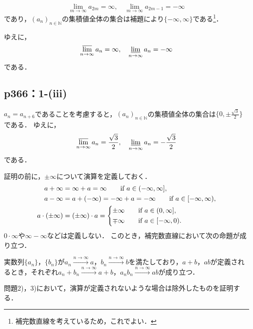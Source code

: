 \documentclass[a4paper,10pt,fleqn]{ltjsarticle}
\begin{document}
    \begin{tleftbar}
        \[
            \lim_{m \to \infty} a_{2m} = \infty , \quad \lim_{m \to \infty} a_{2m-1} = -\infty
        \]
        であり，$(a_n)_{n \in \mathbb{N}}$の集積値全体の集合は補題により$\{ -\infty , \infty \}$である\footnote{補完数直線を考えているため，これでよい．}．

        ゆえに，
        \[
            \varlimsup_{n \to \infty} a_n = \infty , \quad \varliminf_{n \to \infty} a_n =-\infty
        \]
        である．
    \end{tleftbar}

    \subsection*{p366：1-(iii)}

    \begin{tleftbar}
        $ a_{n} = a_{n+6}$であることを考慮すると，$(a_n)_{n \in \mathbb{N}}$の集積値全体の集合は$\{ 0 , \pm \frac{\sqrt{3}}{2} \}$である．
        ゆえに，
        \[
            \varlimsup_{n \to \infty} a_n = \frac{\sqrt{3}}{2} , \quad \varliminf_{n \to \infty} a_n =-\frac{\sqrt{3}}{2}
        \]
        である．
    \end{tleftbar}

    \newpage


    証明の前に，$\pm \infty$について演算を定義しておく．
    \begin{align*}
        a + \infty           & = \infty + a = \infty \qquad \text{if $a \in (-\infty,\infty]$},                   \\
        a - \infty           & = a + (-\infty) = -\infty + a = -\infty \qquad \text{if $a \in [-\infty,\infty)$}, \\
        a \cdot (\pm \infty) & = (\pm \infty) \cdot a =
        \begin{cases*}
            \pm \infty \quad & if $a \in (0,\infty]$,  \\
            \mp \infty \quad & if $a \in [-\infty,0)$.
        \end{cases*}
    \end{align*}
$0 \cdot \infty$や$\infty - \infty$などは定義しない．
このとき，補完数直線において次の命題が成り立つ．
\begin{lemm*}
    実数列$\{a_n\}$，$\{b_n\}$が$a_n \xrightarrow{n \to \infty} a$，$b_n \xrightarrow{n \to \infty} b$を満たしており，$a+b$，$ab$が定義されるとき，それぞれ$a_n + b_n \xrightarrow{n \to \infty} a+b$，$a_n b_n \xrightarrow{n \to \infty} ab$が成り立つ．
\end{lemm*}
問題2)，3)において，演算が定義されないような場合は除外したものを証明する．
\end{document}

